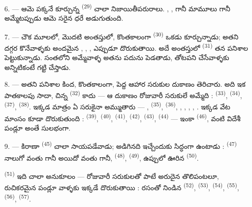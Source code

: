 \VUsaut{4.0mm}
\VUsaut{3.0mm}

6. --- ఆమె పక్కనే కూర్చున్న  \textsuperscript{(29)} చాలా
నిజాయితీపరురాలు. , ,  గానీ మామూలు
 గానీ అమ్మేటప్పుడు ఆమె సరైన ధరే అడుగుతుంది.

7. --- చౌక మూలలో, మొదటి అంతస్తులో, కొంతకాలంగా 
\textsuperscript{(30)} ఒకడు కూర్చున్నాడు; అతని దగ్గర కొనేవాళ్ళకు అందమైన
, , ,
 ఎప్పుడూ దొరుకుతాయి. అదే అంతస్తులో 
\textsuperscript{(31)} తన పనిశాల పెట్టుకున్నాడు. సంతలోని అమ్మేవాళ్ళ 
అతను పదును పెడతాడు, తోటపని చేసేవాళ్ళకు అన్నిటికంటే గట్టి 
 చేస్తాడు.

\VUsaut{4.0mm}
\VUsaut{3.0mm}

8. --- అతని పనిశాల కింద, కొంతకాలంగా, పెద్ద ఆహార సరుకుల దుకాణం తెరిచారు. అది ఇక పాతకాలపు
సాదా, చిన్న  \textsuperscript{(32)} కాదు — ఆ దుకాణం రోజువారీ సరుకులే
అమ్మేది :  \textsuperscript{(33)},  \textsuperscript{(34)},
 \textsuperscript{(37)},  \textsuperscript{(38)}. ఇక్కడ
మాత్రం ఏ సరుకైనా అమ్ముతారు — ,
 \textsuperscript{(35)},  \textsuperscript{(36)},
, , , ,
. ఇక్కడ వేట మాంసం కూడా దొరుకుతుంది : 
\textsuperscript{(39)},  \textsuperscript{(40)}, 
\textsuperscript{(41)},  \textsuperscript{(42)},
 \textsuperscript{(43)},  \textsuperscript{(44)} — ఇంకా
 \textsuperscript{(46)},  వంటి విదేశీ పండ్లూ అంతే
సులభంగా.

9. --- కిరాణా  \textsuperscript{(45)} చాలా సాయపడేవాడు; అడిగినది ఇచ్చేందుకు
సిద్ధంగా ఉంటాడు :  \textsuperscript{(47)} నాలుగో వంతు గానీ అయిదో వంతు గానీ,
 \textsuperscript{(48)},  \textsuperscript{(49)},
ఉప్పులో ఊరిన  \textsuperscript{(50)}.

 \textsuperscript{(51)} ఇది చాలా అనుకూలం — రోజువారీ సరుకులతో పాటే
అరుదైన తొలిపంటలూ, రుచికరమైన పండ్లూ వాళ్ళకు ఇక్కడే దొరుకుతాయి : రసంతో నిండిన
 \textsuperscript{(52)},  \textsuperscript{(53)},
 \textsuperscript{(54)},  \textsuperscript{(55)},
 \textsuperscript{(56)},  \textsuperscript{(57)}.

